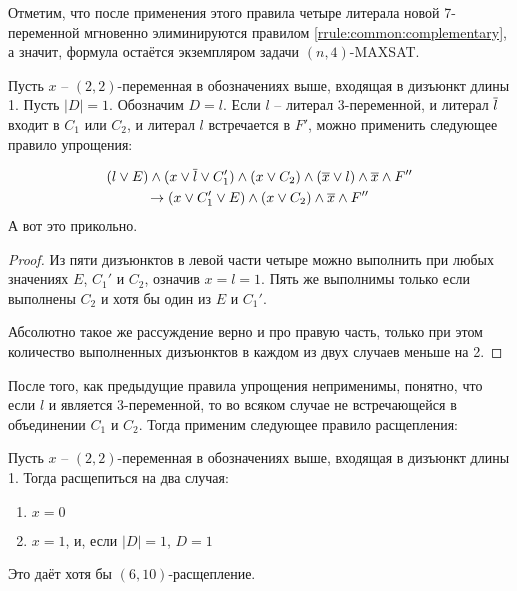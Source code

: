 Отметим, что после применения этого правила четыре литерала новой 7-переменной мгновенно элиминируются правилом \ref{rrule:common:complementary}, а значит, формула остаётся экземпляром задачи $(n,4)$-MAXSAT.

\begin{rrule}
 Пусть $x$ -- $(2,2)$-переменная в обозначениях выше, входящая в дизъюнкт длины 1. Пусть $|D| = 1$. Обозначим $D = l$. Если $l$ -- литерал 3-переменной, и литерал $\overline{l}$ входит в $C_1$ или $C_2$, и литерал $l$ встречается в $F'$, можно применить следующее правило упрощения:

 \begin{gather*}
  (l \vee E) \wedge (x \vee \overline{l} \vee C_1') \wedge (x \vee C_2) \wedge (\overline{x} \vee l) \wedge \overline{x} \wedge F'' \\
  \rightarrow
  (x \vee C_1' \vee E) \wedge (x \vee C_2) \wedge \overline{x} \wedge F''
 \end{gather*}
 {\color{white} А вот это прикольно.}
\end{rrule}

\begin{proof}
 Из пяти дизъюнктов в левой части четыре можно выполнить при любых значениях $E$, $C_1'$ и $C_2$, означив $x = l = 1$. Пять же выполнимы только если выполнены $C_2$ и хотя бы один из $E$ и $C_1'$.

 Абсолютно такое же рассуждение верно и про правую часть, только при этом количество выполненных дизъюнктов в каждом из двух случаев меньше на 2.
\end{proof}

После того, как предыдущие правила упрощения неприменимы, понятно, что если $l$ и является 3-переменной, то во всяком случае не встречающейся в объединении $C_1$ и $C_2$. Тогда применим следующее правило расщепления:

\begin{brule}
 Пусть $x$ -- $(2,2)$-переменная в обозначениях выше, входящая в дизъюнкт длины 1. Тогда расщепиться на два случая:
 \begin{enumerate}
  \item $x = 0$
  \item $x = 1$, и, если $|D| = 1$, $D = 1$
 \end{enumerate}

 Это даёт хотя бы $(6,10)$-расщепление.
 \label{brule:n4:22:uc}
\end{brule}

